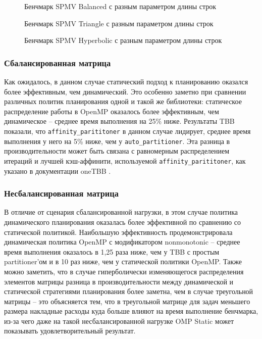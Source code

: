\documentclass[times,specification,annotation]{itmo-student-thesis}
\begin{document}
\begin{figure}[t!]
\centering

\caption{Бенчмарк SPMV Balanced с разным параметром длины строк}\label{Fig:SpmvBalanced}
\end{figure}

\begin{figure}[t!]
\centering

\caption{Бенчмарк SPMV Triangle с разным параметром длины строк}\label{Fig:SpmvTriangle}
\end{figure}

\begin{figure}[t!]
\centering

\caption{Бенчмарк SPMV Hyperbolic с разным параметром длины строк}\label{Fig:SpmvHyper}
\end{figure}


\subsubsection{Сбалансированная матрица}
Как ожидалось, в данном случае статический подход к планированию оказался более эффективным, чем динамический. Это особенно заметно при сравнении различных политик планирования одной и такой же библиотеки: статическое распределение работы в OpenMP оказалось более эффективным, чем динамическое -- среднее время выполнения на 25\% ниже. Результаты TBB показали, что \texttt{affinity\_parititoner} в данном случае лидирует, среднее время выполнения у него на 5\% ниже, чем у \texttt{auto\_partitioner}. Эта разница в производительности может быть связана с равномерным распределением итераций и лучшей кэш-аффинити, используемой \texttt{affinity\_parititoner}, как указано в документации oneTBB \cite{tbb-partitioners}.

\subsubsection{Несбалансированная матрица}
В отличие от сценария сбалансированной нагрузки, в этом случае политика динамического планирования оказалась более эффективной по сравнению со статической политикой.
Наибольшую эффективность продемонстрировала динамическая политика OpenMP с модификатором nonmonotonic -- среднее время выполнения оказалось в 1,25 раза ниже, чем у TBB с простым partitioner'ом и в 10 раз ниже, чем у статической политики OpenMP.
Также можно заметить, что в случае гиперболически изменяющегося распределения элементов матрицы разница в производительности между динамической и статической стратегиями планирования более заметна, чем в случае треугольной матрицы -- это объясняется тем, что в треугольной матрице для задач меньшего размера накладные расходы куда больше влияют на время выполнение бенчмарка, из-за чего даже на такой несбалансированной нагрузке OMP Static может показывать удовлетворительный результат.
\end{document}
